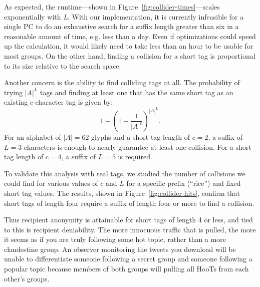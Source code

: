 As expected, the runtime---shown in
Figure~\ref{fig:collider-times}---scales exponentially with \textit{L}.
With our implementation, it is currently infeasible for a single PC to
do an exhaustive search for a suffix length greater than six in a
reasonable amount of time, e.g. less than a day. Even if optimizations
could speed up the calculation, it would likely need to take less than
an hour to be usable for most groups. On the other hand, finding a collision
for a short tag is proportional to its size relative to the search space.

Another concern is the ability to find colliding tags at all. The
probability of trying $|A|^L$ tags and finding at least one that has the
same short tag as an existing $c$-character tag is given by:
%
\[1-(1-\frac{1}{|A|^c})^{|A|^L}.\]
%
For an alphabet of $|A|=62$ glyphs and a short tag length of $c=2$, a
suffix of $L=3$ characters is enough to nearly guarantee at least one
collision. For a short tag length of $c=4$, a suffix of $L=5$ is
required.  

To validate this analysis with real tags, we studied the number of
collisions we could find for various values of $c$ and $L$ for a
specific prefix (``rice'') and fixed short tag values. The results,
shown in Figure~\ref{fig:collider-hits}, confirm that short tags of
length four require a suffix of length four or more to find a collision.

Thus recipient anonymity is attainable for short tags of length 4 or less, and tied
to this is recipient deniability. The more innocuous traffic that is pulled, the more
it seems as if you are truly following some hot topic, rather than a more clandestine 
group. An observer monitoring the tweets you download will be unable to differentiate 
someone following a secret group and someone following a popular topic because members of
both groups will pulling all HooTs from each other's groups.


